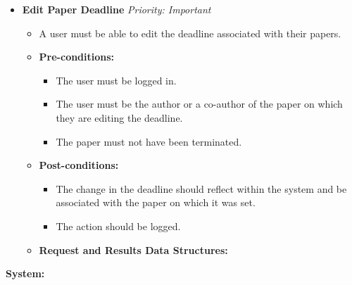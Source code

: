 \documentclass{article}
\begin{document}
\begin{itemize}
					\item \textbf{Edit Paper Deadline} \hfill \textit{Priority: Important}
					\begin{itemize}
						\item A user must be able to edit the deadline associated with their papers.
						\item \textbf{Pre-conditions:}
						\begin{itemize}
							\item The user must be logged in.
							\item The user must be the author or a co-author of the paper on which they are editing the deadline.
							\item The paper must not have been terminated.
						\end{itemize}
						\item \textbf{Post-conditions:}
						\begin{itemize}
							\item The change in the deadline should reflect within the system and be associated with the paper on which it was set.
							\item The action should be logged.
						\end{itemize}
						\item \textbf{Request and Results Data Structures:}
					\end{itemize}									
				\end{itemize}
				\textbf{\large{System:}}
\end{document}
